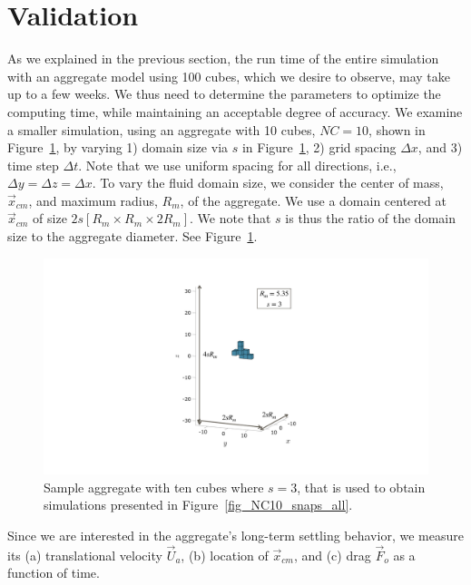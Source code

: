 \section{Validation}
\label{sec:ch3_validation}
As we explained in the previous section, the run time of the entire simulation with an aggregate model using 100 cubes, which we desire to observe, may take up to a few weeks. We thus need to determine the parameters to optimize the computing time, while maintaining an acceptable degree of accuracy. We examine a smaller simulation, using an aggregate with 10 cubes, $NC = 10$, shown in Figure~\ref{fig_sample_agg10}, by varying 1) domain size via $s$ in Figure~\ref{fig_sample_agg10}, 2) grid spacing $\Delta x$, and 3) time step  $\Delta t$. Note that we use uniform spacing for all directions, i.e., $\Delta y = \Delta z = \Delta x $. To vary the fluid domain size, we consider the center of mass,  $\vec{x}_{cm}$, and maximum radius, $R_m$, of the aggregate.
We use a domain centered at $\vec{x}_{cm}$ of size  $2s\left[  R_m \times   R_m \times 2 R_m \right]$. We note that $s$ is thus the ratio of the domain size to the aggregate diameter. See Figure~\ref{fig_sample_agg10}.
\begin{figure}[ht]
	\begin{center}
		\includegraphics[scale=0.4]{./figures/fig_sample_agg10.pdf}
		\caption{Sample aggregate with ten cubes where $s = 3$, that is used to obtain simulations presented in Figure~\ref{fig_NC10_snaps_all}. }
		\label{fig_sample_agg10}
	\end{center}
\end{figure}
\par
Since we are interested in the aggregate's long-term settling behavior, we measure its (a) translational velocity $\vec{U}_a$, (b) location of $\vec{x}_{cm}$, and (c) drag $\vec{F}_o$ as a function of time. 
